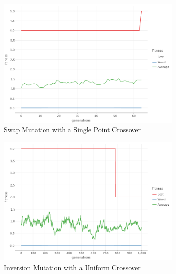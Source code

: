 \begin{figure}[ht!]
\begin{subfigure}{0.45\textwidth}
            \includegraphics[width=\textwidth]{img/beacon_sp_swap_1.png}
            \caption{Swap Mutation with a Single Point Crossover}
            \label{fig:beacon:1:swap}
        \end{subfigure}
        \hfill
        \begin{subfigure}{0.45\textwidth}
            \includegraphics[width=\textwidth]{img/beacon_uniform_inv_1.png}
            \caption{Inversion Mutation with a Uniform Crossover}
            \label{fig:beacon:3:inversion}
        \end{subfigure}
        \begin{subfigure}{0.45\textwidth}

\end{subfigure}
\end{figure}
